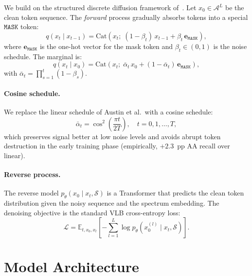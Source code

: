 \documentclass[10pt,twocolumn]{article}
\newcommand{\vect}[1]{\mathbf{#1}}
\newcommand{\E}{\mathbb{E}}
\newcommand{\Cat}{\mathrm{Cat}}
\newcommand{\MASK}{\texttt{MASK}}
\begin{document}
We build on the structured discrete diffusion framework of~\citet{austin2021structured}.
Let $x_0 \in \mathcal{A}^L$ be the clean token sequence.
The \emph{forward} process gradually absorbs tokens into a special $\MASK$ token:
\begin{equation}
  q(x_t \mid x_{t-1}) = \Cat\!\left(x_t;\; (1-\beta_t)\, x_{t-1} + \beta_t\, \vect{e}_\MASK\right),
  \label{eq:forward}
\end{equation}
where $\vect{e}_\MASK$ is the one-hot vector for the mask token and $\beta_t \in (0,1)$ is the
noise schedule.
The marginal is:
\begin{equation}
  q(x_t \mid x_0) = \Cat\!\left(x_t;\; \bar{\alpha}_t\, x_0 + (1-\bar{\alpha}_t)\, \vect{e}_\MASK\right),
  \label{eq:marginal}
\end{equation}
with $\bar{\alpha}_t = \prod_{s=1}^t (1-\beta_s)$.

\paragraph{Cosine schedule.}
We replace the linear schedule of Austin et al.\ with a cosine schedule:
\begin{equation}
  \bar{\alpha}_t = \cos^2\!\!\left(\frac{\pi t}{2T}\right),\quad t = 0, 1, \ldots, T,
  \label{eq:cosine}
\end{equation}
which preserves signal better at low noise levels and avoids abrupt token destruction in the
early training phase (empirically, $+2.3$~pp AA recall over linear).

\paragraph{Reverse process.}
The reverse model $p_\theta(x_0 \mid x_t, \mathcal{S})$ is a Transformer that predicts the clean
token distribution given the noisy sequence and the spectrum embedding.
The denoising objective is the standard VLB cross-entropy loss:
\begin{equation}
  \mathcal{L} = \E_{t, x_0, x_t}\!\left[
    -\sum_{l=1}^{L} \log p_\theta\!\left(x_0^{(l)} \mid x_t, \mathcal{S}\right)
  \right].
  \label{eq:elbo}
\end{equation}

\section{Model Architecture}
\end{document}
